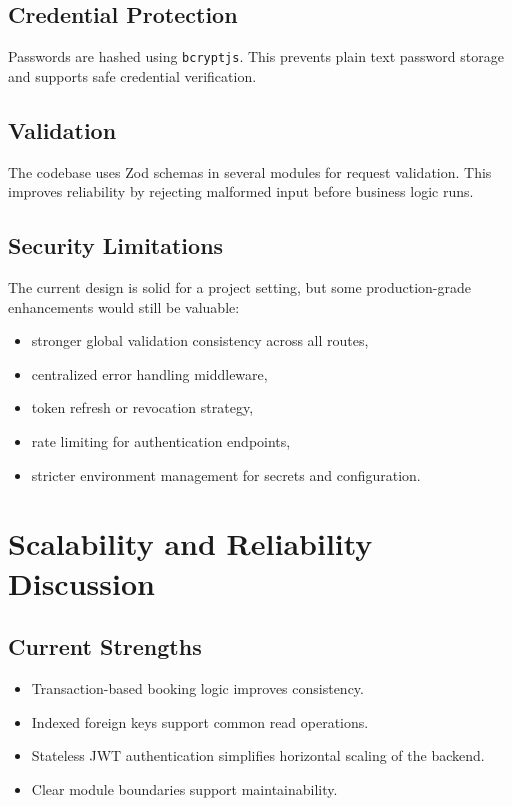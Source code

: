 \documentclass[12pt,a4paper]{article}
\begin{document}
\subsection{Credential Protection}
Passwords are hashed using \texttt{bcryptjs}. This prevents plain text password storage and supports safe credential verification.

\subsection{Validation}
The codebase uses Zod schemas in several modules for request validation. This improves reliability by rejecting malformed input before business logic runs.

\subsection{Security Limitations}
The current design is solid for a project setting, but some production-grade enhancements would still be valuable:
\begin{itemize}
    \item stronger global validation consistency across all routes,
    \item centralized error handling middleware,
    \item token refresh or revocation strategy,
    \item rate limiting for authentication endpoints,
    \item stricter environment management for secrets and configuration.
\end{itemize}

\section{Scalability and Reliability Discussion}
\subsection{Current Strengths}
\begin{itemize}
    \item Transaction-based booking logic improves consistency.
    \item Indexed foreign keys support common read operations.
    \item Stateless JWT authentication simplifies horizontal scaling of the backend.
    \item Clear module boundaries support maintainability.
\end{itemize}
\end{document}
